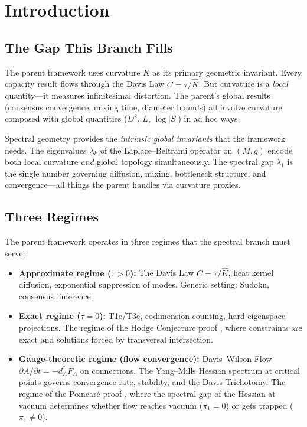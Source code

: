 \documentclass[11pt]{article}
\theoremstyle{definition}
\theoremstyle{remark}
\begin{document}
\section{Introduction}
\label{sec:intro}

\subsection{The Gap This Branch Fills}

The parent framework \cite{DFE} uses curvature $\hat{K}$ as its primary geometric invariant. Every capacity result flows through the Davis Law $C = \tau/\hat{K}$. But curvature is a \emph{local} quantity---it measures infinitesimal distortion. The parent's global results (consensus convergence, mixing time, diameter bounds) all involve curvature composed with global quantities ($D^2$, $L$, $\log|S|$) in ad hoc ways.

Spectral geometry provides the \emph{intrinsic global invariants} that the framework needs. The eigenvalues $\lambda_k$ of the Laplace--Beltrami operator on $(M,g)$ encode both local curvature \emph{and} global topology simultaneously. The spectral gap $\lambda_1$ is the single number governing diffusion, mixing, bottleneck structure, and convergence---all things the parent handles via curvature proxies.

\subsection{Three Regimes}

The parent framework operates in three regimes that the spectral branch must serve:

\begin{itemize}[nosep]
\item \textbf{Approximate regime ($\tau > 0$):} The Davis Law $C = \tau/\hat{K}$, heat kernel diffusion, exponential suppression of modes. Generic setting: Sudoku, consensus, inference.

\item \textbf{Exact regime ($\tau = 0$):} T1e/T3e, codimension counting, hard eigenspace projections. The regime of the Hodge Conjecture proof \cite{HodgeProof}, where constraints are exact and solutions forced by transversal intersection.

\item \textbf{Gauge-theoretic regime (flow convergence):} Davis--Wilson Flow $\partial A/\partial t = -d_A^* F_A$ on connections. The Yang--Mills Hessian spectrum at critical points governs convergence rate, stability, and the Davis Trichotomy. The regime of the Poincar\'{e} proof \cite{PoincareProof}, where the spectral gap of the Hessian at vacuum determines whether flow reaches vacuum ($\pi_1 = 0$) or gets trapped ($\pi_1 \neq 0$).
\end{itemize}
\end{document}
